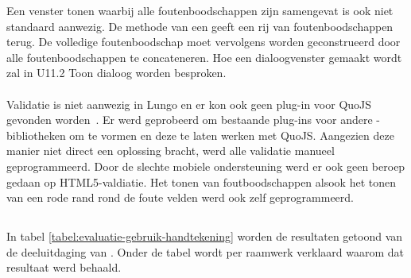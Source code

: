 Een venster tonen waarbij alle foutenboodschappen zijn samengevat is ook niet standaard aanwezig.
De  methode van een  geeft een rij van foutenboodschappen terug.
De volledige foutenboodschap moet vervolgens worden geconstrueerd door alle foutenboodschappen te concateneren.
Hoe een dialoogvenster gemaakt wordt zal in U11.2 Toon dialoog worden besproken.

\paragraph{\lungo}
Validatie is niet aanwezig in Lungo en er kon ook geen plug-in voor QuoJS gevonden worden~\cite{Ameye2013}.
Er werd geprobeerd om bestaande plug-ins voor andere \js{}-bibliotheken om te vormen en deze te laten werken met QuoJS.
Aangezien deze manier niet direct een oplossing bracht, werd alle validatie manueel geprogrammeerd.
Door de slechte mobiele ondersteuning werd er ook geen beroep gedaan op HTML5-valdiatie.
Het tonen van foutboodschappen alsook het tonen van een rode rand rond de foute velden werd ook zelf geprogrammeerd.


\subsection{}
\label{sec:evaluatie-gebruik-handtekening}

In tabel \ref{tabel:evaluatie-gebruik-handtekening} worden de resultaten getoond van de deeluitdaging van .
Onder de tabel wordt per raamwerk verklaard waarom dat resultaat werd behaald.

\begin{table}[H]
\centering
{}
\caption{Gebruik van  voor \st{}~(\sta), \kendo{}~(\kendoa), \jqm{}~(\jqma) en \lungo{}~(\lungoa).}
\label{tabel:evaluatie-gebruik-handtekening}
\end{table}

